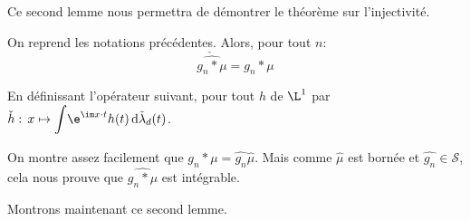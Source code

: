 Ce second lemme nous permettra de démontrer le théorème sur l'injectivité.

\begin{lem}
On reprend les notations précédentes. Alors, pour tout $n$:
\[
\check{\widehat{g_n*\mu}} = g_n*\mu
\]

En définissant l'opérateur suivant, pour tout $h$ de $\L^1$ par $\check{h}: \, x \mapsto \displaystyle{\int} \e^{\im x \cdot t} h(t) \, \mathrm d \tilde{\lambda}_d(t)$.
\end{lem}

\begin{listremarques}
\item
On montre assez facilement que $\widehat{g_n * \mu} = \widehat{g_n} \widehat{\mu}$. Mais comme $\widehat{\mu}$ est bornée et $\widehat{g_n} \in \mathcal{S}$, cela nous prouve que $\widehat{g_n * \mu}$ est intégrable.
\end{listremarques}

Montrons maintenant ce second lemme.

